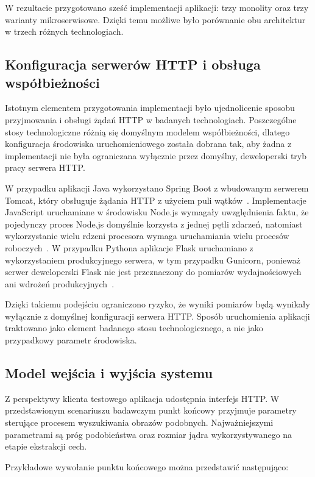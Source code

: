 W rezultacie przygotowano sześć implementacji aplikacji: trzy monolity oraz trzy warianty mikroserwisowe. Dzięki temu możliwe było porównanie obu architektur w trzech różnych technologiach.

\subsection{Konfiguracja serwerów HTTP i obsługa współbieżności}

Istotnym elementem przygotowania implementacji było ujednolicenie sposobu przyjmowania i obsługi żądań HTTP w badanych technologiach. Poszczególne stosy technologiczne różnią się domyślnym modelem współbieżności, dlatego konfiguracja środowiska uruchomieniowego została dobrana tak, aby żadna z implementacji nie była ograniczana wyłącznie przez domyślny, deweloperski tryb pracy serwera HTTP.

W przypadku aplikacji Java wykorzystano Spring Boot z wbudowanym serwerem Tomcat, który obsługuje żądania HTTP z użyciem puli wątków~\cite{apache_tomcat_connector}. Implementacje JavaScript uruchamiane w środowisku Node.js wymagały uwzględnienia faktu, że pojedynczy proces Node.js domyślnie korzysta z jednej pętli zdarzeń, natomiast wykorzystanie wielu rdzeni procesora wymaga uruchamiania wielu procesów roboczych~\cite{node_event_loop}. W przypadku Pythona aplikacje Flask uruchamiano z wykorzystaniem produkcyjnego serwera, w tym przypadku Gunicorn, ponieważ serwer deweloperski Flask nie jest przeznaczony do pomiarów wydajnościowych ani wdrożeń produkcyjnych~\cite{flask_gunicorn}.

Dzięki takiemu podejściu ograniczono ryzyko, że wyniki pomiarów będą wynikały wyłącznie z domyślnej konfiguracji serwera HTTP. Sposób uruchomienia aplikacji traktowano jako element badanego stosu technologicznego, a nie jako przypadkowy parametr środowiska.
\subsection{Model wejścia i wyjścia systemu}

Z perspektywy klienta testowego aplikacja udostępnia interfejs HTTP. W przedstawionym scenariuszu badawczym punkt końcowy przyjmuje parametry sterujące procesem wyszukiwania obrazów podobnych. Najważniejszymi parametrami są próg podobieństwa oraz rozmiar jądra wykorzystywanego na etapie ekstrakcji cech.

Przykładowe wywołanie punktu końcowego można przedstawić następująco:

